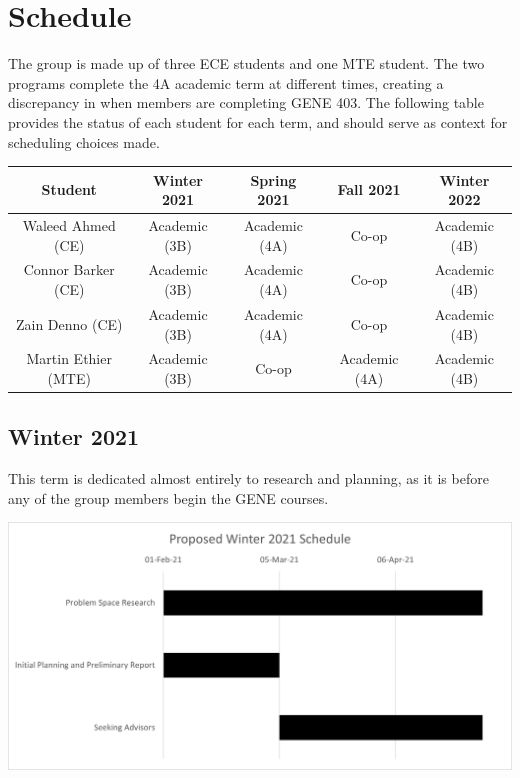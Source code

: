 \documentclass[a4paper,11pt]{article}
\begin{document}
\section{Schedule}
The group is made up of three ECE students and one MTE student. The two programs complete the 4A academic term at different times, creating a discrepancy in when members are completing GENE 403. The following table provides the status of each student for each term, and should serve as context for scheduling choices made.
\begin{table}[ht]
    \centering
    \begin{tabular}{|c|c|c|c|c|}
        \hline
        Student & Winter 2021 & Spring 2021 & Fall 2021 & Winter 2022\\ \hline
        Waleed Ahmed (CE) & Academic (3B) & Academic (4A) & Co-op & Academic (4B)\\ \hline
        Connor Barker (CE) & Academic (3B) & Academic (4A) & Co-op & Academic (4B)\\ \hline
        Zain Denno (CE) & Academic (3B) & Academic (4A) & Co-op & Academic (4B)\\ \hline
        Martin Ethier (MTE) & Academic (3B) & Co-op & Academic (4A) & Academic (4B)\\ \hline
    \end{tabular}
    \label{Advisors}
\end{table}
\subsection{Winter 2021}
This term is dedicated almost entirely to research and planning, as it is before any of the group members begin the GENE courses.
\begin{center}
\includegraphics[scale=0.8]{W21.png}
\end{center}

\newpage
\end{document}
